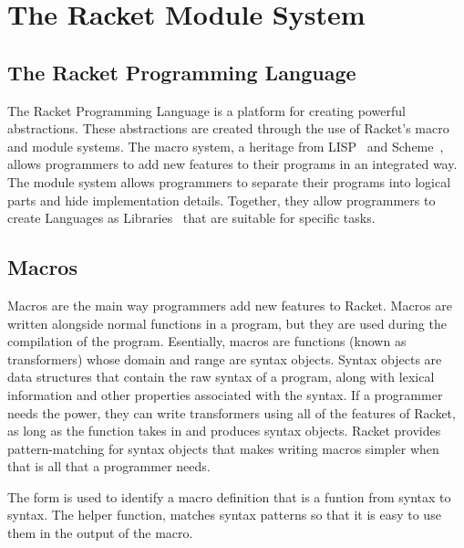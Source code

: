 \chapter{The Racket Module System}
\label{chap:module-system}

\section{The Racket Programming Language}
The Racket Programming Language is a platform for creating powerful abstractions.
These abstractions are created through the use of Racket's macro and module systems. 
The macro system, a heritage from LISP~\cite{LISP} and Scheme~\cite{scheme}, allows programmers to add new features to their programs in an integrated way.
The module system allows programmers to separate their programs into logical parts and hide implementation details. 
Together, they allow programmers to create Languages as Libraries~\cite{lal} that are suitable for specific tasks.

\section{Macros}
Macros are the main way programmers add new features to Racket. 
Macros are written alongside normal functions in a program, but they are used during the compilation of the program. 
Esentially, macros are functions (known as transformers) whose domain and range are syntax objects.
Syntax objects are data structures that contain the raw syntax of a program, along with lexical information and other properties associated with the syntax.
If a programmer needs the power, they can write transformers using all of the features of Racket, as long as the function takes in and produces syntax objects.
Racket provides pattern-matching for syntax objects that makes writing macros simpler when that is all that a programmer needs.

The  form is used to identify a macro definition that is a funtion from syntax to syntax.
The helper function,  matches syntax patterns so that it is easy to use them in the output of the macro.

